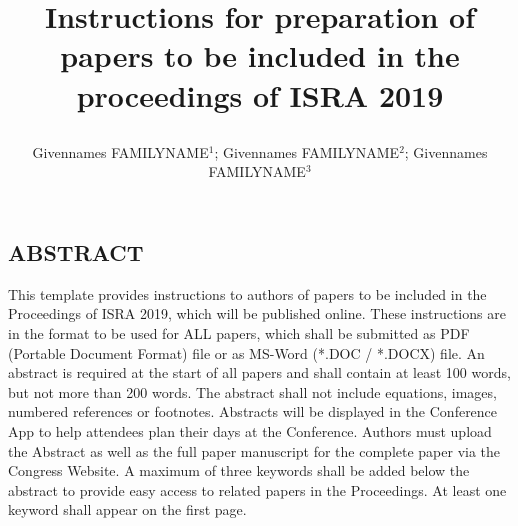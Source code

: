 \documentclass[10.5pt, a4paper, oneside]{extarticle}
\title{\centering \PageHeader
\textbf{\sffamily 
Instructions for preparation of papers to be included in the\\ proceedings of ISRA 2019
}
	\author[ ]{
	Givennames FAMILYNAME$^{1}$; Givennames FAMILYNAME$^{2}$; Givennames FAMILYNAME$^{3}$
}
  	\affil[1]{Dutch University, The Netherlands}
		\affil[2]{Acoustic company, Poland}
		\affil[3]{Institution, Country}
\date{}
}
\begin{document}
\vspace{-12mm}
\subsection*{\fontsize{10.5}{19.2}\textbf{\uppercase{Abstract}}}
{\fontsize{10.5}{60}\selectfont
This template provides instructions to authors of papers to be included in the Proceedings of ISRA 2019, which will be published online. These instructions are in the format to be used for ALL papers, which shall be submitted as PDF (Portable Document Format) file or as MS-Word (*.DOC / *.DOCX) file. An abstract is required at the start of all papers and shall contain at least 100 words, but not more than 200 words. The abstract shall not include equations, images, numbered references or footnotes. Abstracts will be displayed in the Conference App to help attendees plan their days at the Conference. Authors must upload the Abstract as well as the full paper manuscript for the complete paper via the Congress Website. A maximum of three keywords shall be added below the abstract to provide easy access to related papers in the Proceedings. At least one keyword shall appear on the first page.
}
\par\vspace{\baselineskip}
\font=4pt \setlength\parindent{0.5cm}



{\linespread{1.00}\selectfont
%


}
\end{document}
